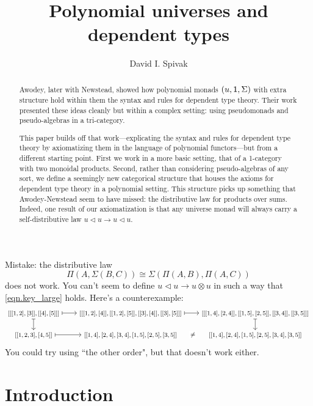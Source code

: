\documentclass[11pt, one side, article]{memoir}
\theoremstyle{definition}
\theoremstyle{plain}
\newcommand{\0}{\textsf{0}}
\newcommand{\1}{\tn{\textsf{1}}}
\newcommand{\tri}{\mathbin{\triangleleft}}
\begin{document}
\title{Polynomial universes and dependent types}

\author{David I. Spivak}

\date{\vspace{-.2in}}

\maketitle

\begin{abstract}
Awodey, later with Newstead, showed how polynomial monads $(u,\1,\Sigma)$ with extra structure hold within them the syntax and rules for dependent type theory. Their work presented these ideas cleanly but within a complex setting: using pseudomonads and pseudo-algebras in a tri-category.

This paper builds off that work---explicating the syntax and rules for dependent type theory by axiomatizing them in the language of polynomial functors---but from a different starting point. First we work in a more basic setting, that of a 1-category with two monoidal products. Second, rather than considering pseudo-algebras of any sort, we define a seemingly new categorical structure that houses the axioms for dependent type theory in a polynomial setting. This structure picks up something that Awodey-Newstead seem to have missed: the distributive law for products over sums. Indeed, one result of our axiomatization is that any universe monad will always carry a self-distributive law $u\tri u\to u\tri u$.
\end{abstract}

{\color{red!50!black}
Mistake: the distributive law
\[
\Pi(A,\Sigma(B,C))\cong\Sigma(\Pi(A,B),\Pi(A,C))
\]
does not work. You can't seem to define $u\tri u\to u\otimes u$ in such a way that \eqref{eqn.key_large} holds. Here's a counterexample:
\[\fontsize{7.5pt}{7.5pt}\selectfont
\begin{tikzcd}
	{[[[1,2],[3]],[[4],[5]]]}\ar[d, |->]\ar[r, |->]&
	{[[[1,2],[4]],[[1,2],[5]],[[3],[4]],[[3],[5]]]}\ar[r, |->]&
	{[[[1,4],[2,4]],[[1,5],[2,5]],[[3,4]],[[3,5]]]}\ar[d, |->]\\
	{[[1,2,3],[4,5]]}\ar[r, |->]&
	{[[1,4],[2,4],[3,4],[1,5],[2,5],[3,5]]}\ar[r, phantom, "\neq" description]&
	{[[1,4],[2,4],[1,5],[2,5],[3,4],[3,5]]}
\end{tikzcd}
\]
You could try using ``the other order", but that doesn't work either.
}

\chapter{Introduction}
\end{document}
